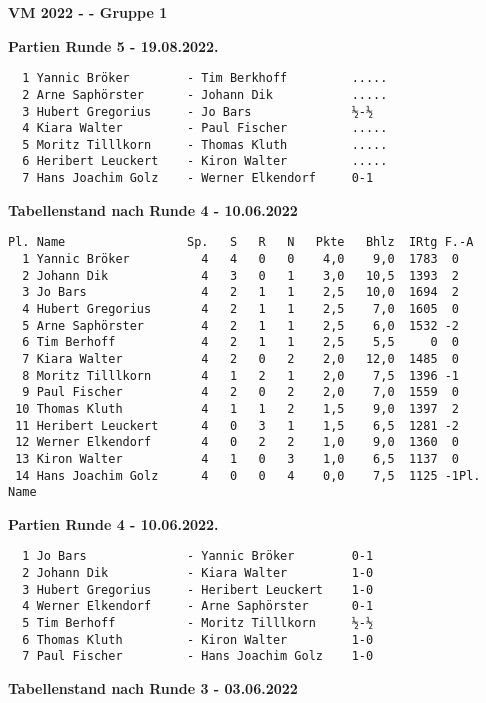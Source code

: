 \documentclass[
]{article}
\author{}
\date{}
\begin{document}
\textbf{VM 2022 - - Gruppe 1}

\textbf{Partien Runde 5 - 19.08.2022.}

\begin{verbatim}
  1 Yannic Bröker        - Tim Berkhoff         .....  
  2 Arne Saphörster      - Johann Dik           .....  
  3 Hubert Gregorius     - Jo Bars              ½-½  
  4 Kiara Walter         - Paul Fischer         .....  
  5 Moritz Tilllkorn     - Thomas Kluth         .....  
  6 Heribert Leuckert    - Kiron Walter         .....  
  7 Hans Joachim Golz    - Werner Elkendorf     0-1  
\end{verbatim}

\textbf{Tabellenstand nach Runde 4 - 10.06.2022 }

\begin{verbatim}
Pl. Name                 Sp.   S   R   N   Pkte   Bhlz  IRtg F.-A
  1 Yannic Bröker          4   4   0   0    4,0    9,0  1783  0
  2 Johann Dik             4   3   0   1    3,0   10,5  1393  2
  3 Jo Bars                4   2   1   1    2,5   10,0  1694  2
  4 Hubert Gregorius       4   2   1   1    2,5    7,0  1605  0
  5 Arne Saphörster        4   2   1   1    2,5    6,0  1532 -2
  6 Tim Berhoff            4   2   1   1    2,5    5,5     0  0
  7 Kiara Walter           4   2   0   2    2,0   12,0  1485  0
  8 Moritz Tilllkorn       4   1   2   1    2,0    7,5  1396 -1
  9 Paul Fischer           4   2   0   2    2,0    7,0  1559  0
 10 Thomas Kluth           4   1   1   2    1,5    9,0  1397  2
 11 Heribert Leuckert      4   0   3   1    1,5    6,5  1281 -2
 12 Werner Elkendorf       4   0   2   2    1,0    9,0  1360  0
 13 Kiron Walter           4   1   0   3    1,0    6,5  1137  0
 14 Hans Joachim Golz      4   0   0   4    0,0    7,5  1125 -1Pl. Name 
\end{verbatim}

\textbf{Partien Runde 4 - 10.06.2022.}

\begin{verbatim}
  1 Jo Bars              - Yannic Bröker        0-1    
  2 Johann Dik           - Kiara Walter         1-0    
  3 Hubert Gregorius     - Heribert Leuckert    1-0    
  4 Werner Elkendorf     - Arne Saphörster      0-1    
  5 Tim Berhoff          - Moritz Tilllkorn     ½-½    
  6 Thomas Kluth         - Kiron Walter         1-0    
  7 Paul Fischer         - Hans Joachim Golz    1-0    
\end{verbatim}

\newpage
\textbf{Tabellenstand nach Runde 3 - 03.06.2022}
\end{document}
